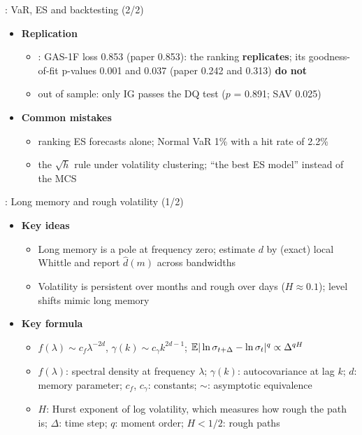 \begin{frame}{: VaR, ES and backtesting (2/2)}
\itemsize{\small}
\begin{itemize}
    \item \textbf{Replication}
    \begin{itemize}
        \item {}: GAS-1F loss 0.853 (paper 0.853): the ranking \textbf{replicates}; its goodness-of-fit p-values 0.001 and 0.037 (paper 0.242 and 0.313) \textbf{do not}
        \item {} out of sample: only IG passes the DQ test ($p$ = 0.891; SAV 0.025)
    \end{itemize}
    \item \textbf{Common mistakes}
    \begin{itemize}
        \item ranking ES forecasts alone; Normal VaR 1\% with a hit rate of 2.2\%
        \item the $\sqrt{h}$ rule under volatility clustering; ``the best ES model'' instead of the MCS
    \end{itemize}
\end{itemize}
\end{frame}

\begin{frame}{: Long memory and rough volatility (1/2)}
\itemsize{\footnotesize}
\begin{itemize}
    \item \textbf{Key ideas}
    \begin{itemize}
        \item Long memory is a pole at frequency zero; estimate $d$ by (exact) local Whittle and report $\hat d(m)$ across bandwidths
        \item Volatility is persistent over months and rough over days ($H \approx 0.1$); level shifts mimic long memory
    \end{itemize}
    \item \textbf{Key formula}
    \begin{itemize}
        \item $f(\lambda) \sim c_f\lambda^{-2d}$, $\gamma(k) \sim c_\gamma k^{2d-1}$; $\mathbb{E}|\ln\sigma_{t+\Delta} - \ln\sigma_t|^q \propto \Delta^{qH}$
        \item $f(\lambda)$: spectral density at frequency $\lambda$; $\gamma(k)$: autocovariance at lag $k$; $d$: memory parameter; $c_f$, $c_\gamma$: constants; $\sim$: asymptotic equivalence
        \item $H$: Hurst exponent of log volatility, which measures how rough the path is; $\Delta$: time step; $q$: moment order; $H < 1/2$: rough paths
    \end{itemize}
\end{itemize}
\end{frame}


